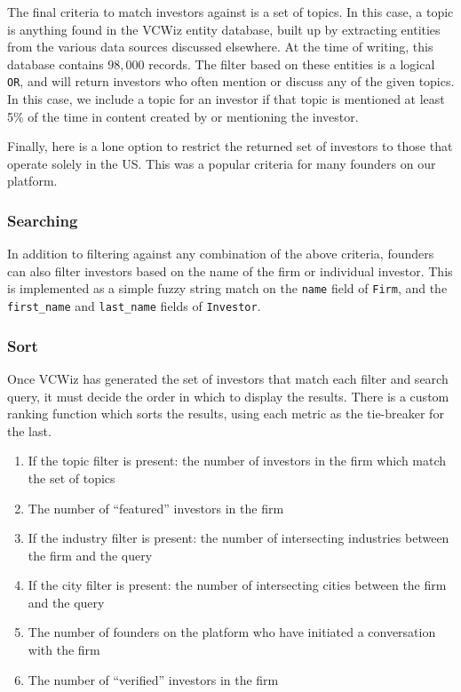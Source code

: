 The final criteria to match investors against is a set of topics. In this case, a topic is anything found in the VCWiz entity database, built up by extracting entities from the various data sources discussed elsewhere. At the time of writing, this database contains $98,000$ records. The filter based on these entities is a logical \texttt{OR}, and will return investors who often mention or discuss any of the given topics. In this case, we include a topic for an investor if that topic is mentioned at least 5\% of the time in content created by or mentioning the investor.

Finally, here is a lone option to restrict the returned set of investors to those that operate solely in the US. This was a popular criteria for many founders on our platform.

\subsubsection{Searching}

In addition to filtering against any combination of the above criteria, founders can also filter investors based on the name of the firm or individual investor. This is implemented as a simple fuzzy string match on the \texttt{name} field of \texttt{Firm}, and the \texttt{first\_name} and \texttt{last\_name} fields of \texttt{Investor}.

\subsubsection{Sort}

Once VCWiz has generated the set of investors that match each filter and search query, it must decide the order in which to display the results. There is a custom ranking function which sorts the results, using each metric as the tie-breaker for the last.

\begin{enumerate}
  \item If the topic filter is present: the number of investors in the firm which match the set of topics
  \item The number of ``featured'' investors in the firm
  \item If the industry filter is present: the number of intersecting industries between the firm and the query
  \item If the city filter is present: the number of intersecting cities between the firm and the query
  \item The number of founders on the platform who have initiated a conversation with the firm
  \item The number of ``verified'' investors in the firm
\end{enumerate}

